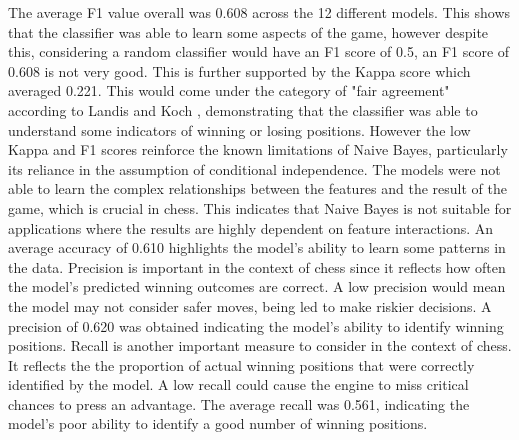 The average F1 value overall was 0.608 across the 12 different models. This shows that the classifier was able to learn some aspects of the game, however despite this, considering a random classifier would have an F1 score of 0.5, an F1 score of 0.608 is not very good. This is further supported by the Kappa score which averaged 0.221. This would come under the category of "fair agreement" according to Landis and Koch \cite{landisMeasurementObserverAgreement1977}, demonstrating that the classifier was able to understand some indicators of winning or losing positions. However the low Kappa and F1 scores reinforce the known limitations of Naive Bayes, particularly its reliance in the assumption of conditional independence. The models were not able to learn the complex relationships between the features and the result of the game, which is crucial in chess. This indicates that Naive Bayes is not suitable for applications where the results are highly dependent on feature interactions. An average accuracy of 0.610 highlights the model's ability to learn some patterns in the data. Precision is important in the context of chess since it reflects how often the model's predicted winning outcomes are correct. A low precision would mean the model may not consider safer moves, being led to make riskier decisions. A precision of 0.620 was obtained indicating the model's ability to identify winning positions. Recall is another important measure to consider in the context of chess. It reflects the the proportion of actual winning positions that were correctly identified by the model. A low recall could cause the engine to miss critical chances to press an advantage. The average recall was 0.561, indicating the model's poor ability to identify a good number of winning positions. 

